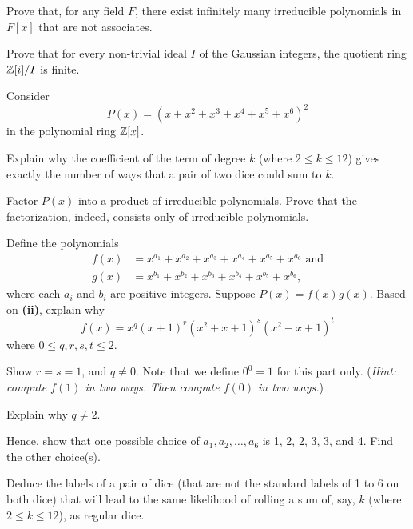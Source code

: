 \begin{problem}
    Prove that, for any field $F$, there exist infinitely many irreducible polynomials in $F[x]$ that are not associates.
\end{problem}

\begin{problem}
    Prove that for every non-trivial ideal $I$ of the Gaussian integers, the quotient ring $\mathbb{Z}[i]/I$ is finite.
\end{problem}

\newpage

\begin{problem}
    Consider
    \[
        P(x) = (x + x^2 + x^3 + x^4 + x^5 + x^6)^2
    \]
    in the polynomial ring $\mathbb{Z}[x]$.
    \begin{partquestions}{\roman*}
        \item Explain why the coefficient of the term of degree $k$ (where $2 \leq k \leq 12$) gives exactly the number of ways that a pair of two dice could sum to $k$.

        \item Factor $P(x)$ into a product of irreducible polynomials. Prove that the factorization, indeed, consists only of irreducible polynomials.

        \item Define the polynomials
        \begin{align*}
            f(x) &= x^{a_1} + x^{a_2} + x^{a_3} + x^{a_4} + x^{a_5} + x^{a_6} \text{ and}\\
            g(x) &= x^{b_1} + x^{b_2} + x^{b_3} + x^{b_4} + x^{b_5} + x^{b_6},
        \end{align*}
        where each $a_i$ and $b_i$ are positive integers. Suppose $P(x) = f(x)g(x)$. Based on \textbf{(ii)}, explain why
        \[
            f(x) = x^q(x+1)^r(x^2+x+1)^s(x^2-x+1)^t
        \]
        where $0 \leq q,r,s,t \leq 2$.

        \item Show $r = s = 1$, and $q \neq 0$. Note that we define $0^0 = 1$ for this part only.\newline
        (\textit{Hint: compute $f(1)$ in two ways. Then compute $f(0)$ in two ways.})

        \item Explain why $q \neq 2$.

        \item Hence, show that one possible choice of $a_1, a_2, \dots, a_6$ is 1, 2, 2, 3, 3, and 4. Find the other choice(s).

        \item Deduce the labels of a pair of dice (that are not the standard labels of 1 to 6 on both dice) that will lead to the same likelihood of rolling a sum of, say, $k$ (where $2 \leq k \leq 12$), as regular dice.
    \end{partquestions}
\end{problem}
